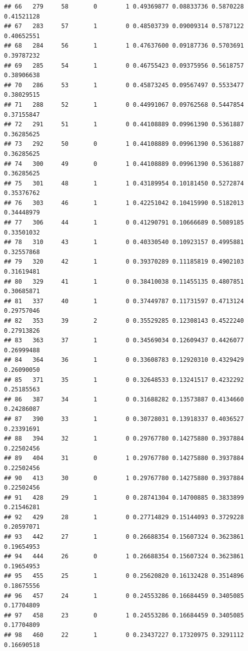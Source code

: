 \documentclass[
]{book}
\begin{document}
\begin{verbatim}
## 66   279     58       0        1 0.49369877 0.08833736 0.5870228 0.41521128
## 67   283     57       1        0 0.48503739 0.09009314 0.5787122 0.40652551
## 68   284     56       1        1 0.47637600 0.09187736 0.5703691 0.39787232
## 69   285     54       1        0 0.46755423 0.09375956 0.5618757 0.38906638
## 70   286     53       1        0 0.45873245 0.09567497 0.5533477 0.38029515
## 71   288     52       1        0 0.44991067 0.09762568 0.5447854 0.37155847
## 72   291     51       1        0 0.44108889 0.09961390 0.5361887 0.36285625
## 73   292     50       0        1 0.44108889 0.09961390 0.5361887 0.36285625
## 74   300     49       0        1 0.44108889 0.09961390 0.5361887 0.36285625
## 75   301     48       1        1 0.43189954 0.10181450 0.5272874 0.35376762
## 76   303     46       1        1 0.42251042 0.10415990 0.5182013 0.34448979
## 77   306     44       1        0 0.41290791 0.10666689 0.5089185 0.33501032
## 78   310     43       1        0 0.40330540 0.10923157 0.4995881 0.32557868
## 79   320     42       1        0 0.39370289 0.11185819 0.4902103 0.31619481
## 80   329     41       1        0 0.38410038 0.11455135 0.4807851 0.30685871
## 81   337     40       1        0 0.37449787 0.11731597 0.4713124 0.29757046
## 82   353     39       2        0 0.35529285 0.12308143 0.4522240 0.27913826
## 83   363     37       1        0 0.34569034 0.12609437 0.4426077 0.26999488
## 84   364     36       1        0 0.33608783 0.12920310 0.4329429 0.26090050
## 85   371     35       1        0 0.32648533 0.13241517 0.4232292 0.25185563
## 86   387     34       1        0 0.31688282 0.13573887 0.4134660 0.24286087
## 87   390     33       1        0 0.30728031 0.13918337 0.4036527 0.23391691
## 88   394     32       1        0 0.29767780 0.14275880 0.3937884 0.22502456
## 89   404     31       0        1 0.29767780 0.14275880 0.3937884 0.22502456
## 90   413     30       0        1 0.29767780 0.14275880 0.3937884 0.22502456
## 91   428     29       1        0 0.28741304 0.14700885 0.3833899 0.21546281
## 92   429     28       1        0 0.27714829 0.15144093 0.3729228 0.20597071
## 93   442     27       1        0 0.26688354 0.15607324 0.3623861 0.19654953
## 94   444     26       0        1 0.26688354 0.15607324 0.3623861 0.19654953
## 95   455     25       1        0 0.25620820 0.16132428 0.3514896 0.18675556
## 96   457     24       1        0 0.24553286 0.16684459 0.3405085 0.17704809
## 97   458     23       0        1 0.24553286 0.16684459 0.3405085 0.17704809
## 98   460     22       1        0 0.23437227 0.17320975 0.3291112 0.16690518

\end{verbatim}
\end{document}
